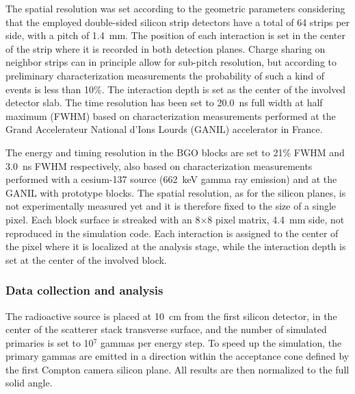 The spatial resolution was set according to the geometric parameters considering that the employed double-sided silicon strip detectors have a total of 64 strips per side, with a pitch of 1.4~mm. The position of each interaction is set in the center of the strip where it is recorded in both detection planes. Charge sharing on neighbor strips can in principle allow for sub-pitch resolution, but according to preliminary characterization measurements the probability of such a kind of events is less than 10\%. The interaction depth is set as the center of the involved detector slab. The time resolution has been set to 20.0~ns full width at half maximum (FWHM) based on characterization measurements performed at the Grand Accelerateur National d'Ions Lourds (GANIL) accelerator in France.

The energy and timing resolution in the BGO blocks are set to 21\% FWHM and 3.0~ns FWHM respectively, also based on characterization measurements performed with a cesium-137 source (662~keV gamma ray emission) and at the GANIL with prototype blocks. The spatial resolution, as for the silicon planes, is not experimentally measured yet and it is therefore fixed to the size of a single pixel. Each block surface is streaked with an 8$\times$8 pixel matrix, 4.4~mm side, not reproduced in the simulation code. Each interaction is assigned to the center of the pixel where it is localized at the analysis stage, while the interaction depth is set at the center of the involved block.

\subsubsection{Data collection and analysis}\label{CC_analysis}
The radioactive source is placed at 10~cm from the first silicon detector, in the center of the scatterer stack transverse surface, and the number of simulated primaries is set to 10$^{7}$ gammas per energy step. To speed up the simulation, the primary gammas are emitted in a direction within the acceptance cone defined by the first Compton camera silicon plane. All results are then normalized to the full solid angle. 



